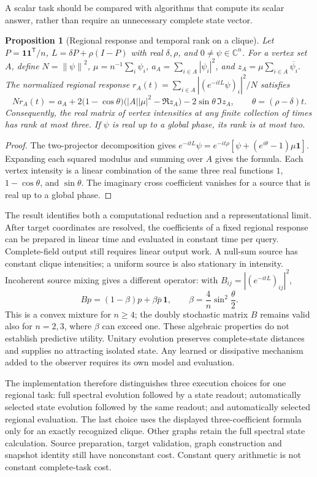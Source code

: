 \documentclass[11pt,a4paper]{article}
\newtheorem{proposition}[theorem]{Proposition}
\theoremstyle{definition}\newtheorem{definition}[theorem]{Definition}
\newcommand{\norm}[1]{\left\lVert#1\right\rVert}
\begin{document}
A scalar task should be compared with algorithms that compute its scalar
answer, rather than require an unnecessary complete state vector.
\begin{proposition}[Regional response and temporal rank on a clique]\label{prop:cliqueintensity}
Let $P=\boldsymbol{1}\boldsymbol{1}^{\mathsf T}/n$,
$L=\delta P+\rho(I-P)$ with real $\delta,\rho$, and
$0\ne\psi\in\mathbb C^n$. For a vertex set $A$, define
$N=\norm{\psi}^2$, $\mu=n^{-1}\sum_i\psi_i$,
$a_A=\sum_{i\in A}|\psi_i|^2$, and
$z_A=\mu\sum_{i\in A}\overline{\psi_i}$.
The normalized regional response
$r_A(t)=\sum_{i\in A}|(e^{-itL}\psi)_i|^2/N$ satisfies
\[
 N r_A(t)=a_A+
 2\bigl(1-\cos\theta\bigr)\bigl(|A||\mu|^2-\Re z_A\bigr)
 -2\sin\theta\,\Im z_A,
 \qquad \theta=(\rho-\delta)t.
\]
Consequently, the real matrix of vertex intensities at any finite collection
of times has rank at most three. If $\psi$ is real up to a global phase,
its rank is at most two.
\end{proposition}
\begin{proof}
The two-projector decomposition gives
$e^{-itL}\psi=e^{-it\rho}[\psi+(e^{i\theta}-1)\mu\boldsymbol{1}]$.
Expanding each squared modulus and summing over $A$ gives the formula.
Each vertex intensity is a linear combination of the same three real
functions $1$, $1-\cos\theta$, and $\sin\theta$. The imaginary cross
coefficient vanishes for a source that is real up to a global phase.
\end{proof}

The result identifies both a computational reduction and a representational
limit. After target coordinates are resolved, the coefficients of a fixed regional response can be prepared in linear time and evaluated
in constant time per query. Complete-field output still requires linear output
work. A null-sum source has constant clique intensities; a uniform source is
also stationary in intensity. Incoherent source mixing gives a different
operator: with $B_{ij}=|(e^{-itL})_{ij}|^2$,
\[
 Bp=(1-\beta)p+\beta\overline p\,\boldsymbol{1},
 \qquad \beta=\frac{4}{n}\sin^2\frac{\theta}{2}.
\]
This is a convex mixture for $n\geq4$; the doubly stochastic matrix $B$
remains valid also for $n=2,3$, where $\beta$ can exceed one.
These algebraic properties do not establish predictive utility. Unitary
evolution preserves complete-state distances and supplies no attracting
isolated state. Any learned or dissipative mechanism added to the observer
requires its own model and evaluation.

The implementation therefore distinguishes three execution choices for one
regional task: full spectral evolution followed by a state readout;
automatically selected state evolution followed by the same readout; and
automatically selected regional evaluation. The last choice uses the displayed
three-coefficient formula only for an exactly recognized clique. Other graphs
retain the full spectral state calculation. Source preparation, target
validation, graph construction and snapshot identity still have nonconstant
cost. Constant query arithmetic is not constant complete-task cost.
\end{document}
